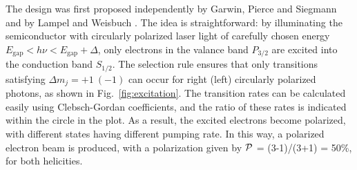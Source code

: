 The design was first proposed independently by Garwin, Pierce and Siegmann \cite{GARWIN}
and by Lampel and Weisbuch \cite{LAMPEL1975877}. The idea is straightforward:
by illuminating the semiconductor with circularly polarized laser light of carefully chosen energy
$E_{\text{gap}} < h\nu < E_{\text{gap}} + \Delta$, only electrons in the valance band $P_{3/2}$ are
excited into the conduction band $S_{1/2}$. The selection rule ensures that only
transitions satisfying $\Delta m_j = +1 \ (-1)$ can occur for right (left) circularly
polarized photons, as shown in Fig.~\ref{fig:excitation}.
The transition rates can be calculated easily using Clebsch-Gordan coefficients, %
and the ratio of these rates is indicated within the circle in the plot.
As a result, the excited electrons become polarized, with different states having different pumping rate.
In this way, a polarized electron beam is produced, with a polarization given by $\mathcal{P}$ = (3-1)/(3+1) = 50\%,
for both helicities.
